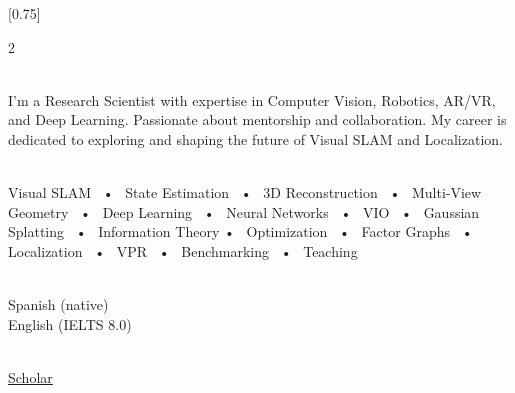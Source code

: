 \documentclass[lighthipster]{simplehipstercv}
\begin{document}
\setlength{\columnsep}{1.5cm}
[0.75]
\begin{paracol}{2}

\paracolbackgroundoptions



\footnotesize
{\setasidefontcolour
\flushright

\begin{center}
\hspace*{0.6cm}
\vspace*{0.5cm}
\begin{minipage}[t]{0.3\textwidth}
%
\end{minipage}
\end{center}


\\[0.5em]

{\footnotesize I'm a Research Scientist with expertise in Computer Vision, Robotics, AR/VR, and Deep Learning. Passionate about mentorship and collaboration. My career is dedicated to exploring and shaping the future of Visual SLAM and Localization.}
\bigskip

 \\[0.5em]

Visual SLAM ~•~ State Estimation ~•~ 3D Reconstruction ~•~ Multi-View Geometry ~•~ Deep Learning ~•~ Neural Networks ~•~ VIO ~•~ Gaussian Splatting ~•~ Information Theory •~ Optimization ~•~ Factor Graphs ~•~ Localization ~•~ VPR ~•~ Benchmarking ~•~ Teaching

\bigskip

\\[0.5em]

Spanish (native) \\ English (IELTS 8.0)

\bigskip

\\[0.5em]
{\href{https://scholar.google.com/citations?user=SDtnGogAAAAJ&hl=es}{Scholar}}

}
\end{paracol}
\end{document}
